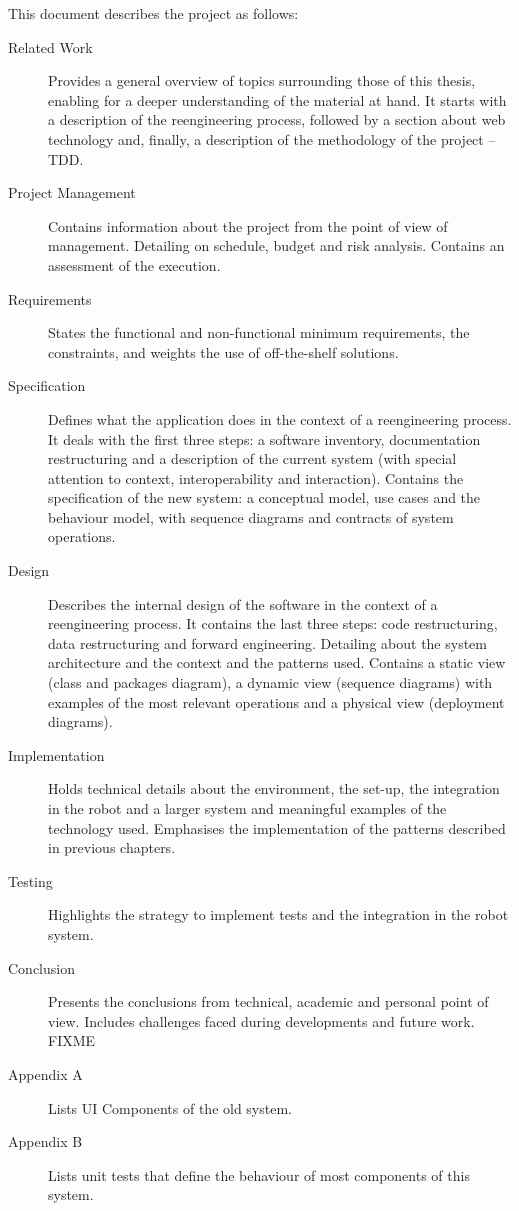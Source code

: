 This document describes the project as follows:
\begin{description}
\item[Related Work] Provides a general overview of topics surrounding those of this thesis, enabling for a deeper understanding of the material at hand.
It starts with a description of the reengineering process, followed by a section about web technology and, finally, a description of the methodology of the project -- \ac{TDD}.

\item[Project Management] Contains information about the project from the point of view of management. 
Detailing on schedule, budget and risk analysis. Contains an assessment of the execution.

\item[Requirements] States the functional and non-functional minimum requirements, the constraints, and weights the use of off-the-shelf solutions.

\item[Specification] Defines what the application does in the context of a reengineering process. 
It deals with the first three steps: a software inventory, documentation restructuring and a description of the current system (with special attention to context, interoperability and interaction).
Contains the specification of the new system: a conceptual model, use cases and the behaviour model, with sequence diagrams and contracts of system operations. 

\item[Design] Describes the internal design of the software in the context of a reengineering process. 
It contains the last three steps: code restructuring, data restructuring and forward engineering.
Detailing about the system architecture and the context and the patterns used.
Contains a static view (class and packages diagram), a dynamic view (sequence diagrams) with examples of the most relevant operations and a physical view (deployment diagrams).

\item[Implementation] Holds technical details about the environment, the set-up, the integration in the robot and a larger system and meaningful examples of the technology used. 
Emphasises the implementation of the patterns described in previous chapters.

\item[Testing] Highlights the strategy to implement tests and the integration in the robot system.

\item[Conclusion] Presents the conclusions from technical, academic and personal point of view. 
Includes challenges faced during developments and future work. FIXME

\item[Appendix A] Lists UI Components of the old system.

\item[Appendix B] Lists unit tests that define the behaviour of most components of this system.

\end{description}